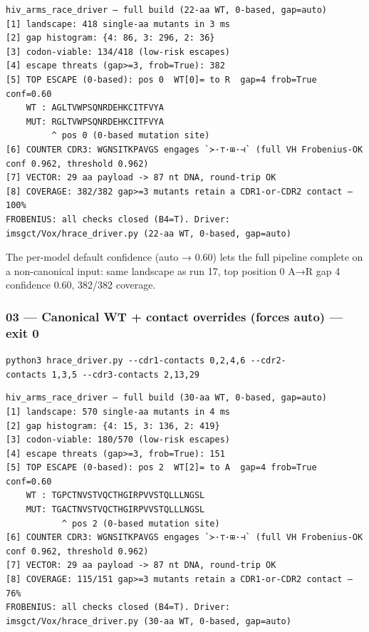 \documentclass[12pt,a4paper]{article}
\begin{document}
\begin{verbatim}
hiv_arms_race_driver — full build (22-aa WT, 0-based, gap=auto)
[1] landscape: 418 single-aa mutants in 3 ms
[2] gap histogram: {4: 86, 3: 296, 2: 36}
[3] codon-viable: 134/418 (low-risk escapes)
[4] escape threats (gap>=3, frob=True): 382
[5] TOP ESCAPE (0-based): pos 0  WT[0]= to R  gap=4 frob=True conf=0.60
    WT : AGLTVWPSQNRDEHKCITFVYA
    MUT: RGLTVWPSQNRDEHKCITFVYA
         ^ pos 0 (0-based mutation site)
[6] COUNTER CDR3: WGNSITKPAVGS engages `≻·⊤·⊞·⊣` (full VH Frobenius-OK conf 0.962, threshold 0.962)
[7] VECTOR: 29 aa payload -> 87 nt DNA, round-trip OK
[8] COVERAGE: 382/382 gap>=3 mutants retain a CDR1-or-CDR2 contact — 100%
FROBENIUS: all checks closed (B4=T). Driver: imsgct/Vox/hrace_driver.py (22-aa WT, 0-based, gap=auto)
\end{verbatim}

The per-model default confidence (auto → 0.60) lets the full pipeline
complete on a non-canonical input: same landscape as run 17, top
position 0 A→R gap 4 confidence 0.60, 382/382 coverage.

\hypertarget{canonical-wt-contact-overrides-forces-auto-exit-0}{%
\subsubsection{03 --- Canonical WT + contact overrides (forces auto) ---
exit 0}\label{canonical-wt-contact-overrides-forces-auto-exit-0}}

\texttt{python3\ hrace\_driver.py\ -\/-cdr1-contacts\ 0,2,4,6\ -\/-cdr2-contacts\ 1,3,5\ -\/-cdr3-contacts\ 2,13,29}

\begin{verbatim}
hiv_arms_race_driver — full build (30-aa WT, 0-based, gap=auto)
[1] landscape: 570 single-aa mutants in 4 ms
[2] gap histogram: {4: 15, 3: 136, 2: 419}
[3] codon-viable: 180/570 (low-risk escapes)
[4] escape threats (gap>=3, frob=True): 151
[5] TOP ESCAPE (0-based): pos 2  WT[2]= to A  gap=4 frob=True conf=0.60
    WT : TGPCTNVSTVQCTHGIRPVVSTQLLLNGSL
    MUT: TGACTNVSTVQCTHGIRPVVSTQLLLNGSL
           ^ pos 2 (0-based mutation site)
[6] COUNTER CDR3: WGNSITKPAVGS engages `≻·⊤·⊞·⊣` (full VH Frobenius-OK conf 0.962, threshold 0.962)
[7] VECTOR: 29 aa payload -> 87 nt DNA, round-trip OK
[8] COVERAGE: 115/151 gap>=3 mutants retain a CDR1-or-CDR2 contact — 76%
FROBENIUS: all checks closed (B4=T). Driver: imsgct/Vox/hrace_driver.py (30-aa WT, 0-based, gap=auto)
\end{verbatim}
\end{document}
